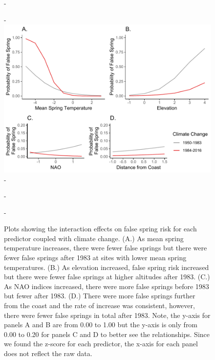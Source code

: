 \documentclass{article}\usepackage[]{graphicx}\usepackage[]{color}
\begin{document}
{\begin{figure} [H]
  -\begin{center}
  -\includegraphics[width=16cm]{..//figures/InteractionPlots/IntrxnPlots_bernie.pdf}
  -\caption{Plots showing the interaction effects on false spring risk for each predictor coupled with climate change. (A.) As mean spring temperature increases, there were fewer false springs but there were fewer false springs after 1983 at sites with lower mean spring temperatures. (B.) As elevation increased, false spring risk increased but there were fewer false springs at higher altitudes after 1983. (C.) As NAO indices increased, there were more false springs before 1983 but fewer after 1983. (D.) There were more false springs further from the coast and the rate of increase was consistent, however, there were fewer false springs in total after 1983. Note, the y-axis for panels A and B are from 0.00 to 1.00 but the y-axis is only from 0.00 to 0.20 for panels C and D to better see the relationships. Since we found the z-score for each predictor, the x-axis for each panel does not reflect the raw data.}\label{fig:intrxns}
  -\end{center}
  -\end{figure}}
  
\end{document}

